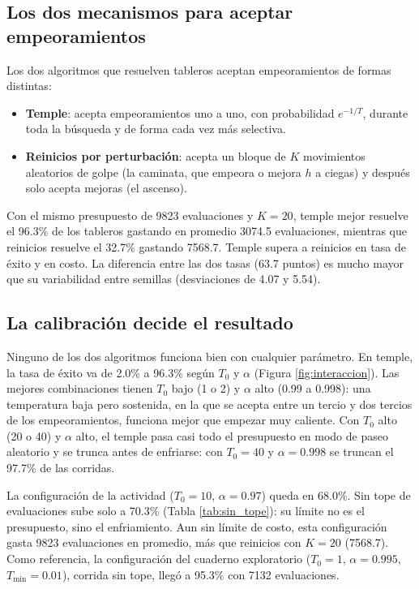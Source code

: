 \documentclass[12pt,a4paper]{article}
\begin{document}
\subsection{Los dos mecanismos para aceptar empeoramientos}

Los dos algoritmos que resuelven tableros aceptan empeoramientos de
formas distintas:

\begin{itemize}
    \item \textbf{Temple}: acepta empeoramientos uno a uno, con
    probabilidad $e^{-1/T}$, durante toda la búsqueda y de forma cada
    vez más selectiva.
    \item \textbf{Reinicios por perturbación}: acepta un bloque de $K$
    movimientos aleatorios de golpe (la caminata, que empeora o mejora
    $h$ a ciegas) y después solo acepta mejoras (el ascenso).
\end{itemize}

Con el mismo presupuesto de 9823 evaluaciones y $K = 20$, temple mejor
resuelve el 96.3\% de los tableros gastando en promedio 3074.5
evaluaciones, mientras que reinicios resuelve el 32.7\% gastando
7568.7. Temple supera a reinicios en tasa de éxito y en costo. La
diferencia entre las dos tasas (63.7 puntos) es mucho mayor que su
variabilidad entre semillas (desviaciones de 4.07 y 5.54).

\subsection{La calibración decide el resultado}

Ninguno de los dos algoritmos funciona bien con cualquier parámetro.
En temple, la tasa de éxito va de 2.0\% a 96.3\% según $T_0$ y $\alpha$
(Figura \ref{fig:interaccion}). Las mejores combinaciones tienen $T_0$
bajo (1 o 2) y $\alpha$ alto (0.99 a 0.998): una temperatura baja pero
sostenida, en la que se acepta entre un tercio y dos tercios de los
empeoramientos, funciona mejor que empezar muy caliente. Con $T_0$ alto
(20 o 40) y $\alpha$ alto, el temple pasa casi todo el presupuesto en
modo de paseo aleatorio y se trunca antes de enfriarse: con $T_0 = 40$
y $\alpha = 0.998$ se truncan el 97.7\% de las corridas.

La configuración de la actividad ($T_0 = 10$, $\alpha = 0.97$) queda en
68.0\%. Sin tope de evaluaciones sube solo a 70.3\% (Tabla
\ref{tab:sin_tope}): su límite no es el presupuesto, sino el
enfriamiento. Aun sin límite de costo, esta configuración gasta 9823
evaluaciones en promedio, más que reinicios con $K = 20$ (7568.7). Como
referencia, la configuración del cuaderno exploratorio ($T_0 = 1$,
$\alpha = 0.995$, $T_{\min} = 0.01$), corrida sin tope, llegó a 95.3\%
con 7132 evaluaciones.
\end{document}
